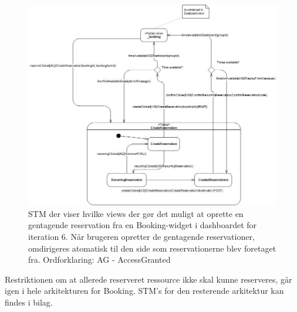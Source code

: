 \begin{figure}[H]
  \includegraphics[width=1.0\linewidth]{01_Billeder/09_Arkitektur/STM_CreateReservationReport.jpg}
  \caption{STM der viser hvilke views der gør det muligt at oprette en gentagende reservation fra en Booking-widget i dashboardet for iteration 6. Når brugeren opretter de gentagende reservationer, omdirigeres atomatisk til den side som reservationerne blev foretaget fra.  Ordforklaring: AG - AccessGranted}
  \label{fig:Booking_STMReservation_Final}
\end{figure}

Restriktionen om at allerede reserveret ressource ikke skal kunne reserveres, går igen i hele arkitekturen for Booking. STM's for den resterende arkitektur kan findes i bilag. 










